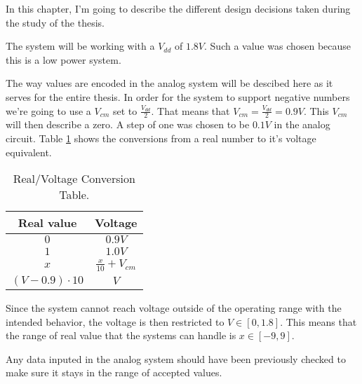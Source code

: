 
\label{cap:design}

In this chapter, I'm going to describe the different design decisions taken during the study of the thesis.

The system will be working with a $V_{dd}$ of $1.8V$. Such a value was chosen because this is a low power system.

The way values are encoded in the analog system will be descibed here as it serves for the entire thesis.
In order for the system to support negative numbers we're going to use a $V_{cm}$ set to $\frac{V_{dd}}{2}$. That means that $V_{cm}=\frac{V_{dd}}{2}=0.9V$. This $V_{cm}$ will then describe a zero. A step of one was chosen to be $0.1V$ in the analog circuit.
Table \ref{tab:valConv} shows the conversions from a real number to it's voltage equivalent.

\begin{table}[H]
  \centering
  \caption{Real/Voltage Conversion Table.}
  \begin{tabular}{|c|c|}
    \hline
    \rowcolor{gray}
    Real value & Voltage \\
    \hline
    $0$ & $0.9V$ \\
    \hline
    $1$ & $1.0V$ \\
    \hline
    $x$ & $\frac{x}{10}+V_{cm}$\\
    \hline
    $(V-0.9)\cdot 10$ & $V$\\
    \hline
  \end{tabular}
  \label{tab:valConv}
\end{table}

Since the system cannot reach voltage outside of the operating range with the intended behavior, the voltage is then restricted to $V\in [0,1.8]$. This means that the range of real value that the systems can handle is $x\in [-9,9]$.

Any data inputed in the analog system should have been previously checked to make sure it stays in the range of accepted values.





\cleardoublepage
